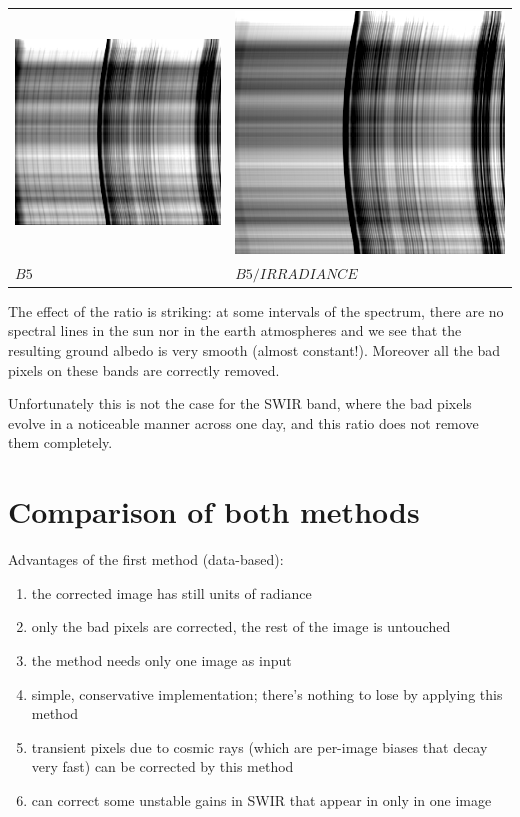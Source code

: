 \documentclass[a4paper]{article}    %
\theoremstyle{note}
\theoremstyle{plain}
\begin{document}
\begin{tabular}{ll}
	\includegraphics[width=0.48\linewidth]{f/b5_avgs_original.png} &
	\includegraphics[width=0.48\linewidth]{f/b5_avgs_irradiance_corrected.png} \\
	$B5$ &
	$B5/IRRADIANCE$ \\
\end{tabular}

The effect of the ratio is striking: at some intervals of the spectrum,
there are no spectral lines in the sun nor in the earth atmospheres and we
see that the resulting ground albedo is very smooth (almost constant!).
Moreover all the bad pixels on these bands are correctly removed.

Unfortunately this is not the case for the SWIR band, where the bad pixels
evolve in a noticeable manner across one day, and this ratio does not remove
them completely.

\clearpage
\section{Comparison of both methods}

Advantages of the first method (data-based):

\begin{enumerate}
	\item the corrected image has still units of radiance
	\item only the bad pixels are corrected, the rest of the image is untouched
	\item the method needs only one image as input
	\item simple, conservative implementation; there's nothing to lose by
		applying this method
	\item transient pixels due to cosmic rays (which are per-image biases that
		decay very fast) can be corrected by this method
	\item can correct some unstable gains in SWIR that appear in only in one
		image
\end{enumerate}
\end{document}
